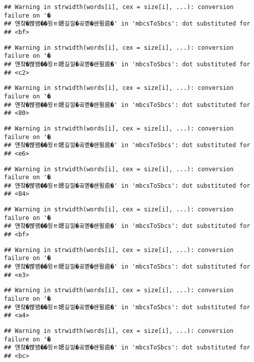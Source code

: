 \documentclass[]{article}
\begin{document}
\begin{verbatim}
## Warning in strwidth(words[i], cex = size[i], ...): conversion failure on '�
## 얜챸�뺞꽴��욍ㅌ媤길낄�곸몓�쇈묄逾�' in 'mbcsToSbcs': dot substituted for
## <bf>
\end{verbatim}

\begin{verbatim}
## Warning in strwidth(words[i], cex = size[i], ...): conversion failure on '�
## 얜챸�뺞꽴��욍ㅌ媤길낄�곸몓�쇈묄逾�' in 'mbcsToSbcs': dot substituted for
## <c2>
\end{verbatim}

\begin{verbatim}
## Warning in strwidth(words[i], cex = size[i], ...): conversion failure on '�
## 얜챸�뺞꽴��욍ㅌ媤길낄�곸몓�쇈묄逾�' in 'mbcsToSbcs': dot substituted for
## <80>
\end{verbatim}

\begin{verbatim}
## Warning in strwidth(words[i], cex = size[i], ...): conversion failure on '�
## 얜챸�뺞꽴��욍ㅌ媤길낄�곸몓�쇈묄逾�' in 'mbcsToSbcs': dot substituted for
## <e6>
\end{verbatim}

\begin{verbatim}
## Warning in strwidth(words[i], cex = size[i], ...): conversion failure on '�
## 얜챸�뺞꽴��욍ㅌ媤길낄�곸몓�쇈묄逾�' in 'mbcsToSbcs': dot substituted for
## <84>
\end{verbatim}

\begin{verbatim}
## Warning in strwidth(words[i], cex = size[i], ...): conversion failure on '�
## 얜챸�뺞꽴��욍ㅌ媤길낄�곸몓�쇈묄逾�' in 'mbcsToSbcs': dot substituted for
## <bf>
\end{verbatim}

\begin{verbatim}
## Warning in strwidth(words[i], cex = size[i], ...): conversion failure on '�
## 얜챸�뺞꽴��욍ㅌ媤길낄�곸몓�쇈묄逾�' in 'mbcsToSbcs': dot substituted for
## <e3>
\end{verbatim}

\begin{verbatim}
## Warning in strwidth(words[i], cex = size[i], ...): conversion failure on '�
## 얜챸�뺞꽴��욍ㅌ媤길낄�곸몓�쇈묄逾�' in 'mbcsToSbcs': dot substituted for
## <a4>
\end{verbatim}

\begin{verbatim}
## Warning in strwidth(words[i], cex = size[i], ...): conversion failure on '�
## 얜챸�뺞꽴��욍ㅌ媤길낄�곸몓�쇈묄逾�' in 'mbcsToSbcs': dot substituted for
## <bc>
\end{verbatim}
\end{document}
